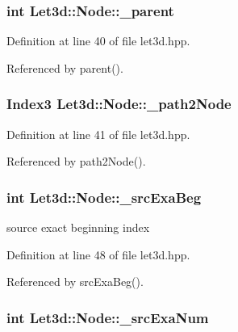 \subsubsection{\setlength{\rightskip}{0pt plus 5cm}int {\bf Let3d::Node::\_\-parent}\hspace{0.3cm}{\tt  [protected]}}\label{classLet3d_1_1Node_7aad8bd56fbfa21a20cedb357f94f9fd_7aad8bd56fbfa21a20cedb357f94f9fd}




Definition at line 40 of file let3d.hpp.

Referenced by parent().
\subsubsection{\setlength{\rightskip}{0pt plus 5cm}Index3 {\bf Let3d::Node::\_\-path2Node}\hspace{0.3cm}{\tt  [protected]}}\label{classLet3d_1_1Node_1105c752dee4c52564446e2f0d042664_1105c752dee4c52564446e2f0d042664}




Definition at line 41 of file let3d.hpp.

Referenced by path2Node().
\subsubsection{\setlength{\rightskip}{0pt plus 5cm}int {\bf Let3d::Node::\_\-src\-Exa\-Beg}\hspace{0.3cm}{\tt  [protected]}}\label{classLet3d_1_1Node_eb7df4426ea02fb77ac08dcddeeecfe7_eb7df4426ea02fb77ac08dcddeeecfe7}


source exact beginning index 

Definition at line 48 of file let3d.hpp.

Referenced by src\-Exa\-Beg().
\subsubsection{\setlength{\rightskip}{0pt plus 5cm}int {\bf Let3d::Node::\_\-src\-Exa\-Num}\hspace{0.3cm}{\tt  [protected]}}\label{classLet3d_1_1Node_e28f628fc4ca1916d190d984082a7ef1_e28f628fc4ca1916d190d984082a7ef1}


